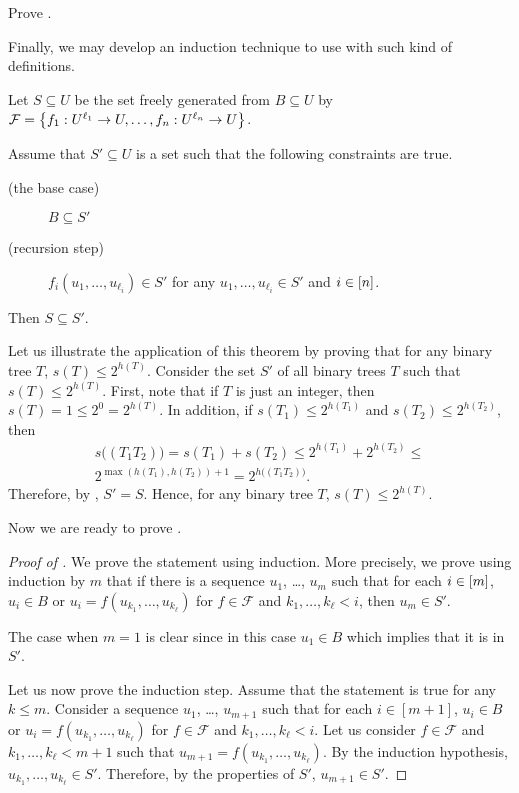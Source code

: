 \begin{exercise}
    Prove .
\end{exercise}


Finally, we may develop an induction technique to use with such kind of
definitions.
\begin{theorem}
\label{theorem:structural-induction}
    Let $S \subseteq U$ be the set freely generated from $B \subseteq U$ by
    $\mathcal{F} = \set{f_1 : U^{\ell_1} \to U, \dots, f_n : U^{\ell_n} \to U}$.

    Assume that $S' \subseteq U$ is a set such that the following constraints
    are true.
    \begin{description}
        \item [(the base case)] $B \subseteq S'$
        \item[(recursion step)] $f_i(u_1, \dots, u_{\ell_i}) \in S'$ for any
            $u_1, \dots, u_{\ell_i} \in S'$ and $i \in [{n}]$.
    \end{description}
    Then $S \subseteq S'$.
\end{theorem}

Let us illustrate the application of this theorem by proving that for any
binary tree $T$, $s(T) \le 2^{h(T)}$.
Consider the set $S'$ of all binary trees $T$ such that $s(T) \le 2^{h(T)}$.
First, note that if $T$ is just an integer, then $s(T) = 1 \le 2^0 = 2^{h(T)}$.
In addition, if $s(T_1) \le 2^{h(T_1)}$ and $s(T_2) \le 2^{h(T_2)}$, then
\begin{multline*}
    s\big( (T_1 T_2) \big) = s(T_1) + s(T_2) \le 2^{h(T_1)} + 2^{h(T_2)} \le \\
    2^{\max(h(T_1), h(T_2)) + 1} = 2^{h\big( (T_1 T_2) \big)}.
\end{multline*}
Therefore, by , $S' = S$. Hence, for any
binary tree $T$, $s(T) \le 2^{h(T)}$.

Now we are ready to prove .
\begin{proof}[Proof of ]
    We prove the statement using induction. More precisely, we prove using
    induction by $m$ that if there is a sequence
    $u_1$, \dots, $u_m$ such that
    for each $i \in [{m}]$, $u_i \in B$ or $u_i = f(u_{k_1}, \dots, u_{k_\ell})$
    for $f \in \mathcal{F}$ and $k_1, \dots, k_\ell < i$, then $u_m \in S'$.

    The case when $m = 1$ is clear since in this case $u_1 \in B$ which implies
    that it is in $S'$.

    Let us now prove the induction step. Assume that the statement is true for any
    $k \le m$. Consider a sequence $u_1$, \dots, $u_{m + 1}$ such that
    for each $i \in [m + 1]$,
    $u_i \in B$ or $u_i = f(u_{k_1}, \dots, u_{k_\ell})$
    for $f \in \mathcal{F}$ and $k_1, \dots, k_\ell < i$. Let us consider
    $f \in \mathcal{F}$ and $k_1, \dots, k_\ell < m + 1$ such that
    $u_{m + 1} = f(u_{k_1}, \dots, u_{k_\ell})$. By the induction hypothesis,
    $u_{k_1}, \dots, u_{k_\ell} \in S'$. Therefore, by the properties of $S'$,
    $u_{m + 1} \in S'$.
\end{proof}

